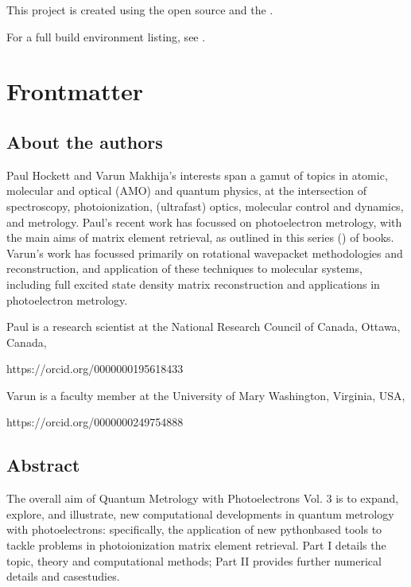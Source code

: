 \documentclass[letterpaper,table,10pt,english]{jupyterBook}
\begin{document}
\sphinxAtStartPar
This project is created using the open source  and the .

\sphinxAtStartPar
For a full build environment listing, see .

\sphinxstepscope


\part{Frontmatter}

\sphinxstepscope


\chapter{About the authors}
\label{\detokenize{frontmatter/about_the_authors:about-the-authors}}\label{\detokenize{frontmatter/about_the_authors::doc}}
\sphinxAtStartPar
Paul Hockett and Varun Makhija’s interests span a gamut of topics in atomic, molecular and optical (AMO) and quantum physics, at the intersection of spectroscopy, photoionization, (ultrafast) optics, molecular control and dynamics, and metrology. Paul’s recent work has focussed on photoelectron metrology, with the main aims of matrix element retrieval, as outlined in this series () of books. Varun’s work has focussed primarily on rotational wavepacket methodologies and reconstruction, and application of these techniques to molecular systems, including full excited state density matrix reconstruction and applications in photoelectron metrology.

\sphinxAtStartPar
Paul is a research scientist at the National Research Council of Canada, Ottawa, Canada, 

https://orcid.org/0000\sphinxhyphen{}0001\sphinxhyphen{}9561\sphinxhyphen{}8433


\sphinxAtStartPar
Varun is a faculty member at the University of Mary Washington, Virginia, USA, 

https://orcid.org/0000\sphinxhyphen{}0002\sphinxhyphen{}4975\sphinxhyphen{}4888


\sphinxstepscope


\chapter{Abstract}
\label{\detokenize{frontmatter/abstract:abstract}}\label{\detokenize{frontmatter/abstract::doc}}
\sphinxAtStartPar
The overall aim of Quantum Metrology with Photoelectrons Vol. 3 is to expand, explore, and illustrate, new computational developments in quantum metrology with photoelectrons: specifically, the application of new python\sphinxhyphen{}based tools to tackle problems in photoionization matrix element retrieval. Part I details the topic, theory and computational methods; Part II provides further numerical details and case\sphinxhyphen{}studies.
\end{document}

